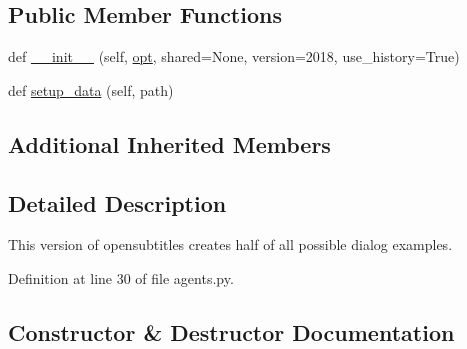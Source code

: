 \subsection*{Public Member Functions}
\begin{DoxyCompactItemize}
\item 
def \hyperlink{classparlai_1_1tasks_1_1opensubtitles_1_1agents_1_1HalfTeacher_aea4e464ad2d0ac4af96d426b171324bc}{\+\_\+\+\_\+init\+\_\+\+\_\+} (self, \hyperlink{classparlai_1_1core_1_1teachers_1_1FbDialogTeacher_af7a9ec497b9cd0292d7b8fa220da7c28}{opt}, shared=None, version=\textquotesingle{}2018\textquotesingle{}, use\+\_\+history=True)
\item 
def \hyperlink{classparlai_1_1tasks_1_1opensubtitles_1_1agents_1_1HalfTeacher_a36081b74536cdad3bc3673b324da1f02}{setup\+\_\+data} (self, path)
\end{DoxyCompactItemize}
\subsection*{Additional Inherited Members}


\subsection{Detailed Description}
\begin{DoxyVerb}This version of opensubtitles creates half of all possible dialog
examples.
\end{DoxyVerb}
 

Definition at line 30 of file agents.\+py.



\subsection{Constructor \& Destructor Documentation}
\mbox{\label{classparlai_1_1tasks_1_1opensubtitles_1_1agents_1_1HalfTeacher_aea4e464ad2d0ac4af96d426b171324bc}} 
